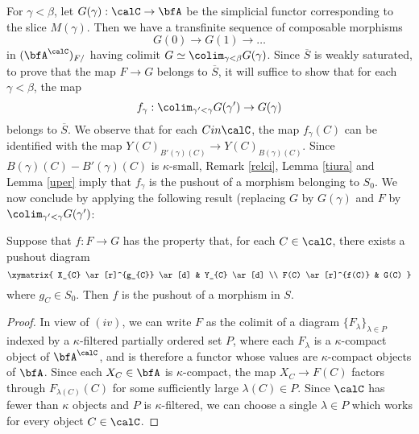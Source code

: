 \begin{Simplicial Categories}
For $\gamma < \beta$, let $G(\gamma): \calC \rightarrow \bfA$ be the simplicial functor corresponding to the slice $M(\gamma)$. Then we have a transfinite sequence of composable morphisms 
$$ G(0) \rightarrow G(1) \rightarrow \ldots$$
in $(\bfA^{\calC})_{F/}$ having colimit $G \simeq \colim_{\gamma < \beta} G(\gamma)$. 
Since $\overline{S}$ is weakly saturated, to prove that the map $F \rightarrow G$ belongs to $\overline{S}$, it will suffice to show that for each $\gamma < \beta$, the map 
$$ f_{\gamma}: \colim_{\gamma' < \gamma} G(\gamma') \rightarrow G(\gamma)$$
belongs to $\overline{S}$. We observe that for each $C in \calC$, the map
$f_{\gamma}(C)$ can be identified with the map
$Y(C)_{ B'(\gamma)(C) } \rightarrow Y(C)_{ B(\gamma)(C) }$. Since $B(\gamma)(C) - B'(\gamma)(C)$ is $\kappa$-small, Remark \ref{relci}, Lemma \ref{tiura} and Lemma \ref{uper} imply that $f_{\gamma}$ is the pushout of a morphism belonging to $S_0$. We now conclude by applying the following result (replacing $G$ by $G(\gamma)$ and $F$ by $\colim_{\gamma' < \gamma} G(\gamma')$:

\begin{lemma}
Suppose that $f: F \rightarrow G$ has the property that, for each $C \in \calC$, there exists a pushout diagram
$$ \xymatrix{ X_{C} \ar[r]^{g_{C}} \ar[d] & Y_{C} \ar[d] \\
F(C) \ar[r]^{f(C)} & G(C) }$$
where $g_{C} \in S_0$. Then $f$ is the pushout of a morphism in $S$.
\end{lemma}

\begin{proof}
In view of $(iv)$, we can write $F$ as the colimit of a diagram $\{ F_{\lambda} \}_{ \lambda \in P}$
indexed by a $\kappa$-filtered partially ordered set $P$, where each $F_{\lambda}$ is a $\kappa$-compact object of $\bfA^{\calC}$, and is therefore a functor whose values are $\kappa$-compact objects of $\bfA$. Since each $X_{C} \in \bfA$ is $\kappa$-compact, the map $X_{C} \rightarrow F(C)$ factors through $F_{\lambda(C)}(C)$ for some sufficiently large $\lambda(C) \in P$. Since $\calC$ has fewer than $\kappa$ objects and $P$ is $\kappa$-filtered, we can choose a single
$\lambda \in P$ which works for every object $C \in \calC$. 


\end{proof}
\end{Simplicial Categories}
